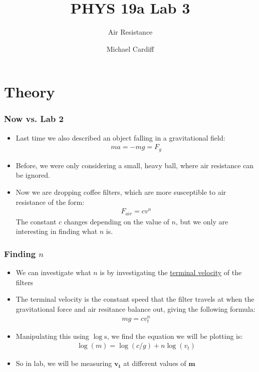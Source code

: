 \documentclass[aspectratio=169]{beamer}
\title{PHYS 19a Lab 3}
\author{Michael Cardiff}
\subtitle{Air Resistance}
\begin{document}
\begin{frame}
  \titlepage
\end{frame}

\section{Theory}
\begin{frame}
  \frametitle{Now vs. Lab 2}
  \begin{itemize}
  \item Last time we also described an object falling in a gravitational field:
    \begin{align*}
      ma=-mg=F_g
    \end{align*}
  \item Before, we were only considering a small, heavy ball, where air resistance can be ignored.
  \item Now we are dropping coffee filters, which are more susceptible to air resistance of the form:
    \begin{align*}
      F_{air}=c v^n
    \end{align*}
    The constant $c$ changes depending on the value of $n$, but we only are interesting in finding what $n$ is.
  \end{itemize}
\end{frame}

\begin{frame}
  \frametitle{Finding $n$}
  \begin{itemize}
  \item We can investigate what $n$ is by investigating the \underline{terminal velocity} of the filters
  \item The terminal velocity is the constant speed that the filter travels at when the gravitational force and air resitance balance out, giving the following formula:
    \begin{align*}
      mg=cv_t^n
    \end{align*}
  \item Manipulating this using $\log$s, we find the equation we will be plotting is:
    \begin{align*}
      \log(m)=\log(c/g)+n\log(v_t)
    \end{align*}
  \item So in lab, we will be measuring $\mathbf{v_t}$ at different values of $\mathbf{m}$
  \end{itemize}
\end{frame}
\end{document}
